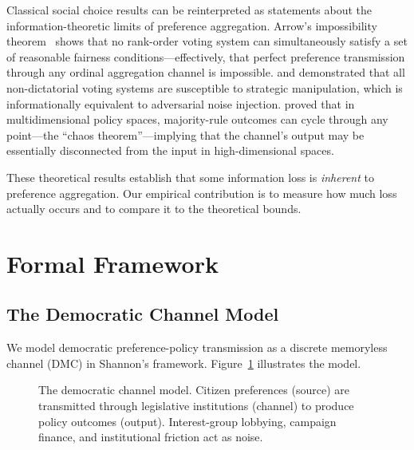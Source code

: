 \documentclass[twocolumn,10pt]{article}
\begin{document}
Classical social choice results can be reinterpreted as statements about the information-theoretic limits of preference aggregation.  Arrow's impossibility theorem~\citep{arrow1951} shows that no rank-order voting system can simultaneously satisfy a set of reasonable fairness conditions---effectively, that perfect preference transmission through any ordinal aggregation channel is impossible.  \citet{gibbard1973} and \citet{satterthwaite1975} demonstrated that all non-dictatorial voting systems are susceptible to strategic manipulation, which is informationally equivalent to adversarial noise injection.  \citet{mckelvey1976} proved that in multidimensional policy spaces, majority-rule outcomes can cycle through any point---the ``chaos theorem''---implying that the channel's output may be essentially disconnected from the input in high-dimensional spaces.

These theoretical results establish that some information loss is \emph{inherent} to preference aggregation.  Our empirical contribution is to measure how much loss actually occurs and to compare it to the theoretical bounds.

\section{Formal Framework}
\label{sec:framework}

\subsection{The Democratic Channel Model}

We model democratic preference-policy transmission as a discrete memoryless channel (DMC) in Shannon's framework.  Figure~\ref{fig:channel} illustrates the model.

\begin{figure}[t]
\centering
{}
\caption{The democratic channel model.  Citizen preferences (source) are transmitted through legislative institutions (channel) to produce policy outcomes (output).  Interest-group lobbying, campaign finance, and institutional friction act as noise.}
\label{fig:channel}
\end{figure}
\end{document}
